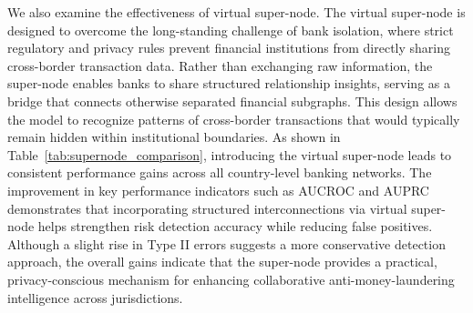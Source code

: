 We also examine the effectiveness of virtual super-node. The virtual super-node is designed to overcome the long-standing challenge of bank isolation, where strict regulatory and privacy rules prevent financial institutions from directly sharing cross-border transaction data. Rather than exchanging raw information, the super-node enables banks to share structured relationship insights, serving as a bridge that connects otherwise separated financial subgraphs. This design allows the model to recognize patterns of cross-border transactions that would typically remain hidden within institutional boundaries. As shown in Table~\ref{tab:supernode_comparison}, introducing the virtual super-node leads to consistent performance gains across all country-level banking networks. The improvement in key performance indicators such as AUCROC and AUPRC demonstrates that incorporating structured interconnections via virtual super-node helps strengthen risk detection accuracy while reducing false positives. Although a slight rise in Type II errors suggests a more conservative detection approach, the overall gains indicate that the super-node provides a practical, privacy-conscious mechanism for enhancing collaborative anti-money-laundering intelligence across jurisdictions.



